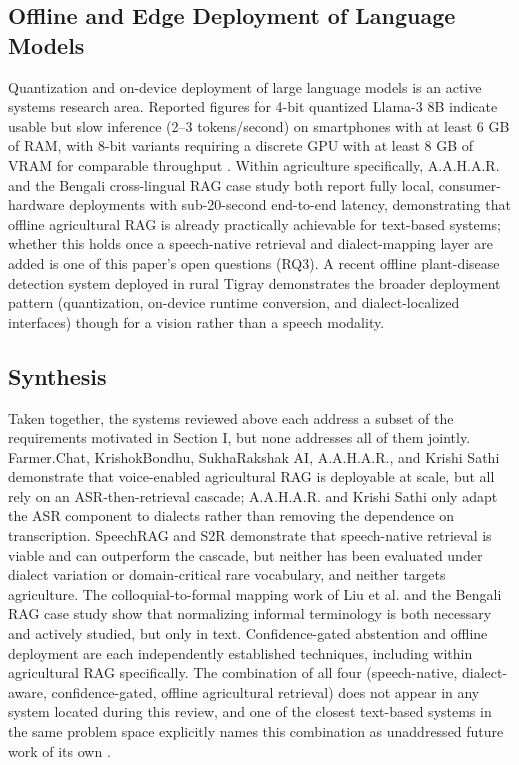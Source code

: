 \documentclass[conference]{IEEEtran}
\begin{document}
\subsection{Offline and Edge Deployment of Language Models}

Quantization and on-device deployment of large language models is an active systems research area. Reported figures for 4-bit quantized Llama-3 8B indicate usable but slow inference (2–3 tokens/second) on smartphones with at least 6 GB of RAM, with 8-bit variants requiring a discrete GPU with at least 8 GB of VRAM for comparable throughput \cite{compactllm2026}. Within agriculture specifically, A.A.H.A.R. \cite{dubey2025aahar} and the Bengali cross-lingual RAG case study \cite{hossain2026bengalirag} both report fully local, consumer-hardware deployments with sub-20-second end-to-end latency, demonstrating that offline agricultural RAG is already practically achievable for text-based systems; whether this holds once a speech-native retrieval and dialect-mapping layer are added is one of this paper's open questions (RQ3). A recent offline plant-disease detection system deployed in rural Tigray \cite{tigray2025plantdisease} demonstrates the broader deployment pattern (quantization, on-device runtime conversion, and dialect-localized interfaces) though for a vision rather than a speech modality.

\subsection{Synthesis}

Taken together, the systems reviewed above each address a subset of the requirements motivated in Section I, but none addresses all of them jointly. Farmer.Chat, KrishokBondhu, SukhaRakshak AI, A.A.H.A.R., and Krishi Sathi demonstrate that voice-enabled agricultural RAG is deployable at scale, but all rely on an ASR-then-retrieval cascade; A.A.H.A.R. and Krishi Sathi only adapt the ASR component to dialects rather than removing the dependence on transcription. SpeechRAG and S2R demonstrate that speech-native retrieval is viable and can outperform the cascade, but neither has been evaluated under dialect variation or domain-critical rare vocabulary, and neither targets agriculture. The colloquial-to-formal mapping work of Liu et al. and the Bengali RAG case study show that normalizing informal terminology is both necessary and actively studied, but only in text. Confidence-gated abstention and offline deployment are each independently established techniques, including within agricultural RAG specifically. The combination of all four (speech-native, dialect-aware, confidence-gated, offline agricultural retrieval) does not appear in any system located during this review, and one of the closest text-based systems in the same problem space explicitly names this combination as unaddressed future work of its own \cite{hossain2026bengalirag}.
\end{document}
